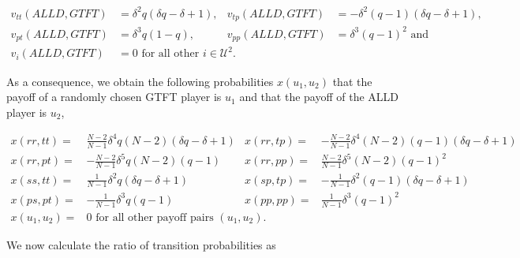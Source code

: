 \documentclass[11pt]{article}
\theoremstyle{plainCl1}
\theoremstyle{plainCl2}
\begin{document}
\begin{align*}
    v_{tt} (ALLD,GTFT) & = \delta^{2} q \left(\delta q - \delta + 1\right), & 
    v_{tp}(ALLD,GTFT) & = - \delta^{2} \left(q - 1\right) \left(\delta q - \delta + 1\right), \\
    v_{pt} (ALLD, GTFT ) & = \delta^{3} q \left(1 - q\right), & 
    v_{pp} (ALLD, GTFT) & = \delta^{3} \left(q - 1\right)^{2} \text{ and }\\
    v_{i}(ALLD,GTFT) & =  0 \text{ for all other } i \in \mathcal{U}^{2}.
\end{align*}

As a consequence, we obtain the following probabilities \(x(u_1, u_2)\) that the
payoff of a randomly chosen GTFT player is \(u_1\) and that the payoff of the
ALLD player is \(u_2\),

\begin{align*}
  x(rr, tt) = & \frac{N-2}{N - 1} \delta^{4} q \left(N - 2\right) \left(\delta q - \delta + 1\right) &
  x(rr, tp) = & - \frac{N-2}{N - 1} \delta^{4} \left(N - 2\right) \left(q - 1\right) \left(\delta q - \delta + 1\right)\\
  x(rr, pt) = & - \frac{N-2}{N - 1} \delta^{5} q \left(N - 2\right) \left(q - 1\right) &
  x(rr, pp) = & \frac{N-2}{N - 1} \delta^{5} \left(N - 2\right) \left(q - 1\right)^{2}\\
  x(ss, tt) = & \frac{1}{N -1}\delta^{2} q \left(\delta q - \delta + 1\right) & 
  x(sp, tp) = & - \frac{1}{N -1}\delta^{2} \left(q - 1\right) \left(\delta q - \delta + 1\right) \\
  x(ps, pt) = & - \frac{1}{N -1}\delta^{3} q \left(q - 1\right) &
  x(pp, pp) = & \frac{1}{N -1}\delta^{3} \left(q - 1\right)^{2}\\
  x(u_1, u_2) = &  0 \text{ for all other payoff pairs } (u_1, u_2). &
\end{align*}

We now calculate the ratio of transition probabilities as
\end{document}
